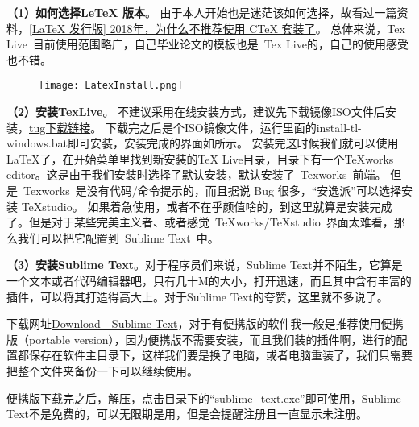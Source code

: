 \documentclass[lang=cn,11pt,a4paper]{elegantpaper}
\begin{document}
\textbf{（1）如何选择LeTeX 版本}。
由于本人开始也是迷茫该如何选择，故看过一篇资料，\href{https://zhuanlan.zhihu.com/p/45174503}{[LaTeX 发行版] 2018年，为什么不推荐使用 CTeX 套装了}。
总体来说，Tex Live~目前使用范围略广，自己毕业论文的模板也是~Tex Live的，自己的使用感受也不错。

\begin{figure}[!htb]
\centering
\texttt{[image: LatexInstall.png]}
\caption{}
\label{fig.LatexInstall}
\end{figure}
\textbf{（2）安装TexLive}。
不建议采用在线安装方式，建议先下载镜像ISO文件后安装，\href{http://tug.org/texlive/}{tug下载链接}。
下载完之后是个ISO镜像文件，运行里面的install-tl-windows.bat即可安装，安装完成的界面如所示。
安装完这时候我们就可以使用LaTeX了，在开始菜单里找到新安装的TeX Live目录，目录下有一个TeXworks editor。这是由于我们安装时选择了默认安装，默认安装了~Texworks~前端。
但是~Texworks~是没有代码/命令提示的，而且据说 Bug 很多，“安逸派”可以选择安装 TeXstudio。
如果着急使用，或者不在乎颜值啥的，到这里就算是安装完成了。但是对于某些完美主义者、或者感觉~TeXworks/TeXstudio~界面太难看，那么我们可以把它配置到~Sublime Text~中。

\textbf{（3）安装Sublime Text}。对于程序员们来说，Sublime Text并不陌生，它算是一个文本或者代码编辑器吧，只有几十M的大小，打开迅速，而且其中含有丰富的插件，可以将其打造得高大上。对于Sublime Text的夸赞，这里就不多说了。

下载网址\href{http://www.sublimetext.com/3}{Download - Sublime Text}，对于有便携版的软件我一般是推荐使用便携版（portable version），因为便携版不需要安装，而且我们装的插件啊，进行的配置都保存在软件主目录下，这样我们要是换了电脑，或者电脑重装了，我们只需要把整个文件夹备份一下可以继续使用。

便携版下载完之后，解压，点击目录下的“sublime\_text.exe”即可使用，Sublime Text不是免费的，可以无限期是用，但是会提醒注册且一直显示未注册。
\end{document}

